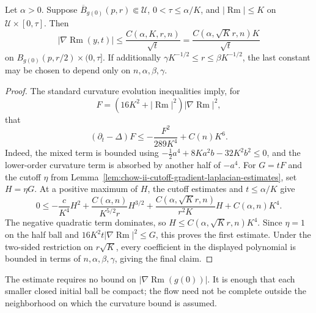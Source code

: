 \begin{theorem}
\label{thm:chow-ii-shi-local-first-derivative-estimate}
Let \(\alpha>0\).  Suppose \(\overline B_{g(0)}(p,r)\Subset\mathcal U\),
\(0<\tau\le\alpha/K\), and \(|\operatorname{Rm}|\le K\) on
\(\mathcal U\times[0,\tau]\).  Then
\[
|\nabla\operatorname{Rm}(y,t)|\le
\frac{C(\alpha,K,r,n)}{\sqrt t}
=\frac{C(\alpha,\sqrt K r,n)K}{\sqrt t}
\]
on \(B_{g(0)}(p,r/2)\times(0,\tau]\).  If additionally
\(\gamma K^{-1/2}\le r\le\beta K^{-1/2}\), the last constant may be chosen
to depend only on \(n,\alpha,\beta,\gamma\).
\end{theorem}
\begin{proof}
\sketch The standard curvature evolution inequalities imply, for
\[
F=(16K^2+|\operatorname{Rm}|^2)|\nabla\operatorname{Rm}|^2,
\]
that
\[
(\partial_t-\Delta)F\le-\frac{F^2}{289K^4}+C(n)K^6.
\]
Indeed, the mixed term is bounded using
\(-\tfrac12a^4+8Ka^2b-32K^2b^2\le0\), and the lower-order curvature term is
absorbed by another half of \(-a^4\).  For \(G=tF\) and the cutoff \(\eta\)
from Lemma~\ref{lem:chow-ii-cutoff-gradient-laplacian-estimates}, set
\(H=\eta G\).  At a positive maximum of \(H\), the cutoff estimates and
\(t\le\alpha/K\) give
\[
0\le-\frac c{K^4}H^2
+\frac{C(\alpha,n)}{K^{5/2}r}H^{3/2}
+\frac{C(\alpha,\sqrt K r,n)}{r^2K}H+C(\alpha,n)K^4.
\]
The negative quadratic term dominates, so
\(H\le C(\alpha,\sqrt K r,n)K^4\).  Since \(\eta=1\) on the half ball and
\(16K^2t|\nabla\operatorname{Rm}|^2\le G\), this proves the first estimate.  Under the
two-sided restriction on \(r\sqrt K\), every coefficient in the displayed
polynomial is bounded in terms of \(n,\alpha,\beta,\gamma\), giving the final
claim.
\end{proof}

\begin{remark}
\label{rem:chow-ii-local-first-estimate-initial-data}
The estimate requires no bound on \(|\nabla\operatorname{Rm}(g(0))|\).  It is enough that
each smaller closed initial ball be compact; the flow need not be complete
outside the neighborhood on which the curvature bound is assumed.
\end{remark}

